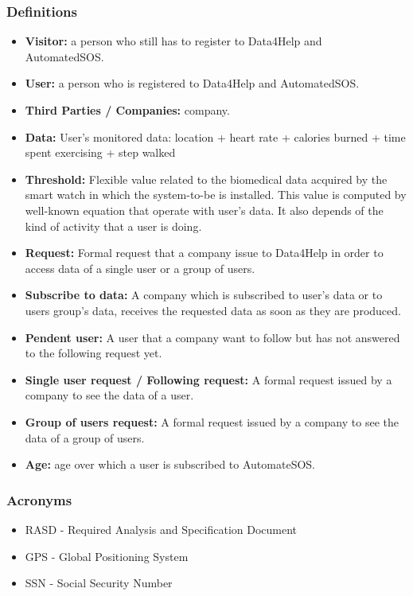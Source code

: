 \documentclass{article}
\begin{document}
\subsubsection{Definitions}
\begin{itemize}
	\item\textbf{Visitor:} a person who still has to register to Data4Help and\\ AutomatedSOS.
	\item\textbf{User:} a person who is registered to Data4Help and AutomatedSOS.
	\item\textbf{Third Parties / Companies:} company.
	\item\textbf{Data:} User's monitored data: location + heart rate + calories burned + time spent exercising + step walked 
	\item \textbf{Threshold:} Flexible value related to the biomedical data acquired by the smart watch in which the system-to-be is installed. This value is computed by well-known equation that operate with user's data. It also depends of the kind of activity that a user is doing.  
	\item \textbf{Request:} Formal request that a company issue to Data4Help in order to access data of a single user or a group of users. 
	\item \textbf{Subscribe to data:} A company which is subscribed to user's data or to users group's data, receives the requested data as soon as they are produced.  
	\item \textbf{Pendent user:} A user that a company want to follow but has not answered to the following request yet.
	\item \textbf{Single user request / Following request:} A formal request issued by a company to see the data of a user.
	\item \textbf{Group of users request:} A formal request issued by a company to see the data of a group of users.
	\item \textbf{Age:} age over which a user is subscribed to AutomateSOS. 
\end{itemize}
\subsubsection{Acronyms}
\begin{itemize}
	\item RASD - Required Analysis and Specification Document
	\item GPS - Global Positioning System
	\item SSN - Social Security Number
\end{itemize}
\end{document}
